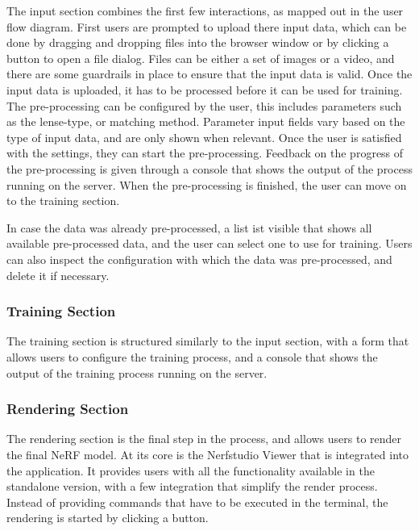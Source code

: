 The input section combines the first few interactions, as mapped out in the user flow diagram.
First users are prompted to upload there input data, which can be done by dragging and dropping files into the browser window or by clicking a button to open a file dialog.
Files can be either a set of images or a video, and there are some guardrails in place to ensure that the input data is valid.
Once the input data is uploaded, it has to be processed before it can be used for training. 
The pre-processing can be configured by the user, this includes parameters such as the lense-type, or matching method.
Parameter input fields vary based on the type of input data, and are only shown when relevant.
Once the user is satisfied with the settings, they can start the pre-processing.
Feedback on the progress of the pre-processing is given through a console that shows the output of the process running on the server.
When the pre-processing is finished, the user can move on to the training section. 

In case the data was already pre-processed, a list ist visible that shows all available pre-processed data, and the user can select one to use for training.
Users can also inspect the configuration with which the data was pre-processed, and delete it if necessary.

\subsubsection{Training Section}

The training section is structured similarly to the input section, with a form that allows users to configure the training process, and a console that shows the output of the training process running on the server.

\subsubsection{Rendering Section}

The rendering section is the final step in the process, and allows users to render the final NeRF model.
At its core is the Nerfstudio Viewer that is integrated into the application. 
It provides users with all the functionality available in the standalone version, with a few integration that simplify the render process.
Instead of providing commands that have to be executed in the terminal, the rendering is started by clicking a button.

